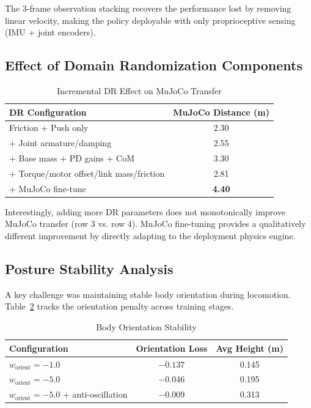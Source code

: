 \documentclass[conference]{IEEEtran}
\begin{document}
The 3-frame observation stacking recovers the performance lost by removing linear velocity, making the policy deployable with only proprioceptive sensing (IMU + joint encoders).

\subsection{Effect of Domain Randomization Components}

\begin{table}[t]
\caption{Incremental DR Effect on MuJoCo Transfer}
\label{tab:ablation_dr}
\centering
\begin{tabular}{lc}
\toprule
\textbf{DR Configuration} & \textbf{MuJoCo Distance (m)} \\
\midrule
Friction + Push only & 2.30 \\
+ Joint armature/damping & 2.55 \\
+ Base mass + PD gains + CoM & 3.30 \\
+ Torque/motor offset/link mass/friction & 2.81 \\
+ MuJoCo fine-tune & \textbf{4.40} \\
\bottomrule
\end{tabular}
\end{table}

Interestingly, adding more DR parameters does not monotonically improve MuJoCo transfer (row 3 vs. row 4). MuJoCo fine-tuning provides a qualitatively different improvement by directly adapting to the deployment physics engine.

\subsection{Posture Stability Analysis}

A key challenge was maintaining stable body orientation during locomotion. Table~\ref{tab:orientation} tracks the orientation penalty across training stages.

\begin{table}[t]
\caption{Body Orientation Stability}
\label{tab:orientation}
\centering
\begin{tabular}{lcc}
\toprule
\textbf{Configuration} & \textbf{Orientation Loss} & \textbf{Avg Height (m)} \\
\midrule
$w_{\text{orient}} = -1.0$ & $-0.137$ & 0.145 \\
$w_{\text{orient}} = -5.0$ & $-0.046$ & 0.195 \\
$w_{\text{orient}} = -5.0$ + anti-oscillation & $-0.009$ & 0.313 \\
\bottomrule
\end{tabular}
\end{table}
\end{document}
